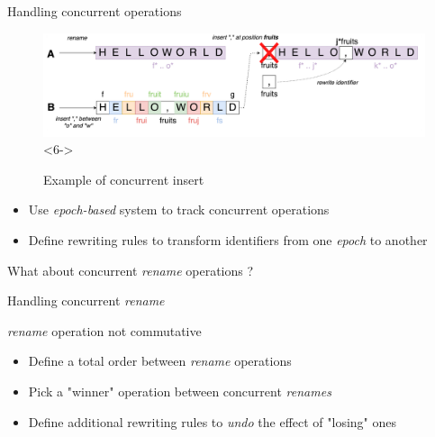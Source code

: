 \documentclass[10pt]{beamer}
\begin{document}
\begin{frame}{Handling concurrent operations}
\begin{figure}
    \includegraphics[scale=0.08]{img/concurrent-insert-rename-6.png}<6->
    \caption{Example of concurrent insert}
  \end{figure}
  \begin{itemize}
    \item<5-> Use \emph{epoch-based} system to track concurrent operations
    \item<6-> Define rewriting rules to transform identifiers from one \emph{epoch} to another
  \end{itemize}
\end{frame}

\begin{frame}[standout]
  What about concurrent \emph{rename} operations ?
\end{frame}

\begin{frame}{Handling concurrent \emph{rename}}

  \begin{block}{\alert{\emph{rename} operation not commutative}}

    \pause

    \begin{itemize}
      \item Define a total order between \emph{rename} operations
      \item Pick a "winner" operation between concurrent \emph{renames}
      \item Define additional rewriting rules to \emph{undo} the effect of "losing" ones
    \end{itemize}
  \end{block}
\end{frame}
\end{document}
